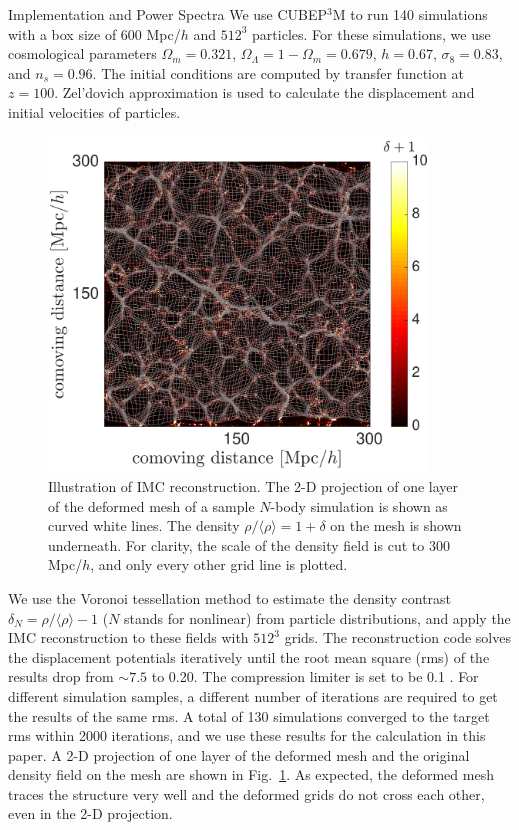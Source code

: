 \begin{section}{Implementation and Power Spectra}
  \label{sec:simulation}
  We use \textsc{CUBEP$^3$M} \citep{bib:Harnois2013} to run
  140 simulations with a box size of 600 Mpc/$h$ and $512^3$ particles.
  For these simulations, we use cosmological
  parameters $\Omega_m=0.321$, $\Omega_{\Lambda}=1-\Omega_m=0.679$,
  $h=0.67$, $\sigma_8=0.83$, and $n_s=0.96$.
  The initial conditions are computed by
  transfer function \citep{bib:Lewis2000}
  at $z=100$.
  Zel'dovich
  approximation is used to calculate the displacement and initial velocities
  of particles.

  \begin{figure}
    \centering
    \includegraphics[width=0.9\textwidth]{fig1.pdf}
    \caption{ Illustration of IMC reconstruction.
      The 2-D projection of one layer of the deformed mesh of a sample
      $N$-body simulation is shown as curved white lines.  The
      density $\rho/\langle\rho\rangle=1+\delta$ on the mesh is shown
      underneath. For clarity, the scale of the density field is cut to 
      300 Mpc/$h$, and only every other grid line is plotted.}
    \label{fig:simandrec}
 \end{figure}

 We use the Voronoi tessellation method \citep{bib:Van1994} to estimate the density contrast
 $\delta_N=\rho/\langle\rho\rangle-1$ ($N$ stands for nonlinear) from particle distributions, and apply the
 IMC reconstruction to these fields with $512^3$ grids.
 The reconstruction code solves the displacement potentials iteratively
 until the root mean square (rms) of the results drop from $\sim 7.5$
 to 0.20. The compression limiter is set to be 0.1 \citep{bib:Pen1995, bib:Pen1998,bib:ZhuH2016}. 
 For different simulation samples, a different number of
 iterations are required to get the results of the same rms. A total of
 130 simulations converged to the target rms within 2000 iterations, 
 and we use these results for the calculation in this paper.
 A 2-D projection
 of one layer of the deformed mesh and the original density field on
 the mesh are shown in Fig.~\ref{fig:simandrec}. 
 As expected, the deformed mesh traces the structure very well and
 the deformed grids do not cross each other, even in the 2-D projection.
 

\end{section}
